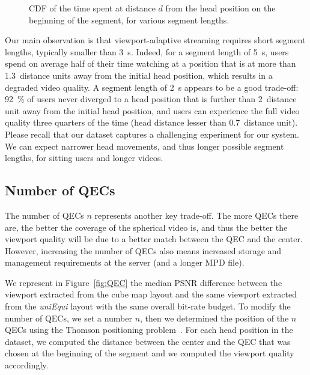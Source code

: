 \begin{figure}
\centering

\caption{CDF of the time spent at distance $d$ from the head position on the beginning of the
segment, for various segment lengths.}\label{cdf-dataset}
\end{figure}

Our main observation is that viewport-adaptive streaming requires
short segment lengths, typically smaller than \SI{3}{\second}. Indeed,
for a segment length of \SI{5}{\second}, users spend on average half of
their time watching at a position that is at more than
\num{1.3}~distance units away from the initial head position, which
results in a degraded video quality. A segment length of
\SI{2}{\second} appears to be a good trade-off: \SI{92}{\percent} of
users never diverged to a head position that is further than
\num{2}~distance unit away from the initial head position, and users
can experience the full video quality three quarters of the time (head distance
lesser than \num{0.7}~distance unit). Please recall that our dataset
captures a challenging experiment for our system. We can expect
narrower head movements, and thus longer possible segment lengths, for
sitting users and longer videos.


\subsection{Number of \acp{QEC}}

The number of \acp{QEC} $n$ represents another key trade-off. The more
\acp{QEC} there are, the better the coverage of the spherical video
is, and thus the better the viewport quality will be due to a better
match between the \ac{QEC} and the \FoV{} center. However,
increasing the number of \acp{QEC} also means increased storage and
management requirements at the server (and a longer \ac{MPD} file).


We represent in Figure~\ref{fig:QEC} the median \ac{PSNR} difference
between the viewport extracted from the cube map layout and the
same viewport extracted from the \emph{uniEqui} layout with the same
overall bit-rate budget. To modify the number of \acp{QEC}, we set a
number $n$, then we determined the position of the $n$ \acp{QEC}
using the Thomson positioning problem~\cite{rakhmanov1994electrons}.
For each head position in the dataset, we computed the distance
between the \FoV{} center and the \ac{QEC} that was chosen at the
beginning of the segment and we computed the viewport quality
accordingly.


